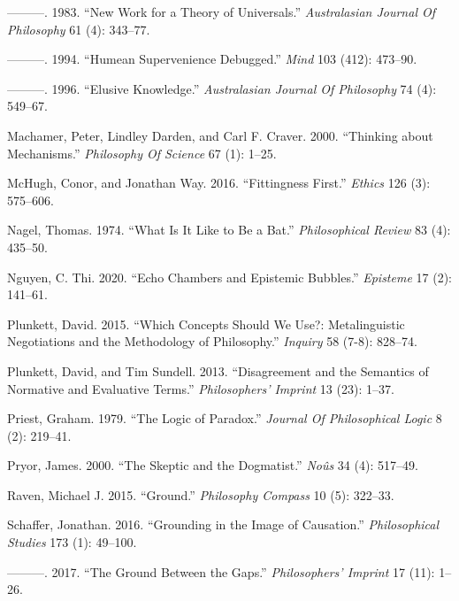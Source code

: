\documentclass[
  10pt,
  letterpaper,
  DIV=11,
  numbers=noendperiod,
  twoside]{scrartcl}
\newlength{\cslhangindent}
\newenvironment{CSLReferences}[2] %
 {\begin{list}{}{%
  \setlength{\itemindent}{0pt}
  \setlength{\leftmargin}{0pt}
  \setlength{\parsep}{0pt}
  \ifodd #1
   \setlength{\leftmargin}{\cslhangindent}
   \setlength{\itemindent}{-1\cslhangindent}
  \fi
  \setlength{\itemsep}{#2\baselineskip}}}
 {\end{list}}
\begin{document}
\begin{CSLReferences}{1}{0}
---------. 1983. {``New Work for a Theory of Universals.''}
\emph{Australasian Journal Of Philosophy} 61 (4): 343--77.

---------. 1994. {``Humean Supervenience Debugged.''} \emph{Mind} 103
(412): 473--90.

---------. 1996. {``Elusive Knowledge.''} \emph{Australasian Journal Of
Philosophy} 74 (4): 549--67.

Machamer, Peter, Lindley Darden, and Carl F. Craver. 2000. {``Thinking
about Mechanisms.''} \emph{Philosophy Of Science} 67 (1): 1--25.

McHugh, Conor, and Jonathan Way. 2016. {``Fittingness First.''}
\emph{Ethics} 126 (3): 575--606.

Nagel, Thomas. 1974. {``What Is It Like to Be a Bat.''}
\emph{Philosophical Review} 83 (4): 435--50.

Nguyen, C. Thi. 2020. {``Echo Chambers and Epistemic Bubbles.''}
\emph{Episteme} 17 (2): 141--61.

Plunkett, David. 2015. {``Which Concepts Should We Use?: Metalinguistic
Negotiations and the Methodology of Philosophy.''} \emph{Inquiry} 58
(7-8): 828--74.

Plunkett, David, and Tim Sundell. 2013. {``Disagreement and the
Semantics of Normative and Evaluative Terms.''} \emph{Philosophers'
Imprint} 13 (23): 1--37.

Priest, Graham. 1979. {``The Logic of Paradox.''} \emph{Journal Of
Philosophical Logic} 8 (2): 219--41.

Pryor, James. 2000. {``The Skeptic and the Dogmatist.''} \emph{Noûs} 34
(4): 517--49.

Raven, Michael J. 2015. {``Ground.''} \emph{Philosophy Compass} 10 (5):
322--33.

Schaffer, Jonathan. 2016. {``Grounding in the Image of Causation.''}
\emph{Philosophical Studies} 173 (1): 49--100.

---------. 2017. {``The Ground Between the Gaps.''} \emph{Philosophers'
Imprint} 17 (11): 1--26.


\end{CSLReferences}
\end{document}
